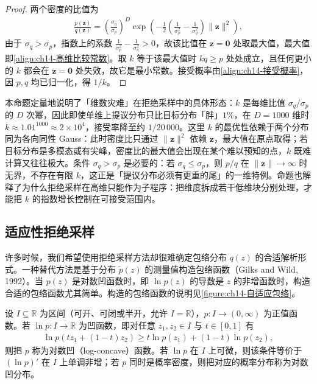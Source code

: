 \documentclass[../../main.tex]{subfiles}
\begin{document}
\begin{proof}
两个密度的比值为
\begin{align*}
\frac{p(\bm{z})}{q(\bm{z})}=\left(\frac{\sigma_{q}}{\sigma_{p}}\right)^{D}\exp\left(-\frac{1}{2}\left(\frac{1}{\sigma_{p}^{2}}-\frac{1}{\sigma_{q}^{2}}\right)\lVert\bm{z}\rVert^{2}\right),
\end{align*}
由于 $\sigma_{q}>\sigma_{p}$，指数上的系数 $\frac{1}{\sigma_{p}^{2}}-\frac{1}{\sigma_{q}^{2}}>0$，故该比值在 $\bm{z}=\bm{0}$ 处取最大值，最大值即\eqref{align:ch14-高维比较常数}。取 $k$ 等于该最大值时 $kq\geqslant p$ 处处成立，且任何更小的 $k$ 都会在 $\bm{z}=\bm{0}$ 处失效，故它是最小常数。接受概率由\eqref{align:ch14-接受概率}，因 $p,q$ 均已归一化，得 $1/k$。
\end{proof}

\begin{remark}本命题定量地说明了「维数灾难」在拒绝采样中的具体形态：$k$ 是每维比值 $\sigma_{q}/\sigma_{p}$ 的 $D$ 次幂，因此即使单维上提议分布只比目标分布「胖」$1\%$，在 $D=1000$ 维时 $k\approx1.01^{1000}\approx2\times10^{4}$，接受率降至约 $1/20\,000$。这里 $k$ 的最优性依赖于两个分布同为各向同性 Gauss：此时密度比只通过 $\lVert\bm{z}\rVert^{2}$ 依赖 $\bm{z}$，最大值在原点取得；若目标分布是多模态或有尖峰，密度比的最大值会出现在某个难以预知的点，$k$ 既难计算又往往极大。条件 $\sigma_{q}>\sigma_{p}$ 是必要的：若 $\sigma_{q}\leqslant\sigma_{p}$，则 $p/q$ 在 $\lVert\bm{z}\rVert\to\infty$ 时无界，不存在有限 $k$，这正是「提议分布必须有更重的尾」的一维特例。命题也解释了为什么拒绝采样在高维只能作为子程序：把维度拆成若干低维块分别处理，才能把 $k$ 的指数增长控制在可接受范围内。
\end{remark}

\subsection{适应性拒绝采样}\label{subsection:ch14-适应性拒绝采样}

许多时候，我们希望使用拒绝采样方法却很难确定包络分布 $q(z)$ 的合适解析形式。一种替代方法是基于分布 $\widetilde{p}(z)$ 的测量值构造包络函数（Gilks and Wild, 1992）。当 $p(z)$ 是对数凹函数时，即 $\ln p(z)$ 的导数是 $z$ 的非增函数时，构造合适的包络函数尤其简单。构造的包络函数的说明见\cref{figure:ch14-自适应包络}。

\begin{definition}[对数凹函数]\label{definition:ch14-对数凹}
设 $I\subseteq\mathbb{R}$ 为区间（可开、可闭或半开，允许 $I=\mathbb{R}$），$p:I\to(0,\infty)$ 为正值函数。若 $\ln p:I\to\mathbb{R}$ 为凹函数，即对任意 $z_{1},z_{2}\in I$ 与 $t\in[0,1]$ 有
\begin{align*}
\ln p\left(tz_{1}+(1-t)z_{2}\right)\geqslant t\ln p(z_{1})+(1-t)\ln p(z_{2}),
\end{align*}
则把 $p$ 称为对数凹（log-concave）函数。若 $\ln p$ 在 $I$ 上可微，则该条件等价于 $\left(\ln p\right)'$ 在 $I$ 上单调非增；若 $p$ 同时是概率密度，则把对应的概率分布称为对数凹分布。
\end{definition}
\end{document}
